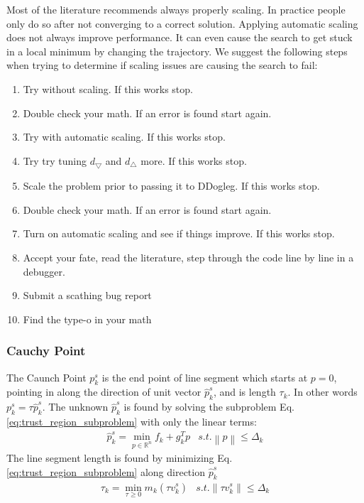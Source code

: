 \documentclass[peerreview,compsoc,onecolumn]{IEEEtran}
\newcommand{\R}{\mathbb{R}}
\newcommand{\norm}[1]{\left\lVert#1\right\rVert}
\newenvironment{enumargin}[1]{\begin{enumerate}[leftmargin=#1\textwidth , rightmargin=#1\textwidth]}{\end{enumerate}}
\begin{document}
Most of the literature recommends always properly scaling. In practice people only do so after not converging to a correct solution. Applying automatic scaling does not always improve performance. It can even cause the search to get stuck in a local minimum by changing the trajectory. We suggest the following steps when trying to determine if scaling issues are causing the search to fail:
\begin{enumargin}{0.2}
\item Try without scaling. If this works stop.
\item Double check your math. If an error is found start again.
\item Try with automatic scaling. If this works stop.
\item Try try tuning $d_{\bigtriangledown}$ and $d_{\bigtriangleup}$ more. If this works stop.
\item Scale the problem prior to passing it to DDogleg. If this works stop.
\item Double check your math. If an error is found start again.
\item Turn on automatic scaling and see if things improve. If this works stop.
\item Accept your fate, read the literature, step through the code line by line in a debugger.
\item Submit a scathing bug report
\item Find the type-o in your math
\end{enumargin}

\subsubsection{Cauchy Point}
\label{section:cauchy} 

The Caunch Point $p^s_k$ is the end point of line segment which starts at $p=0$, pointing in along the direction of unit vector $\hat{p}^s_k$, and is length $\tau_k$. In other words $p^s_k = \tau \hat{p}^s_k$. The unknown $\hat{p}^s_k$ is found by solving the subproblem Eq. \ref{eq:trust_region_subproblem} with only the linear terms:
\begin{equation}
\begin{array}{lr}
\hat{p}^s_k = \min\limits_{p\in \R^n} f_k + g_k^T p & s.t. \norm{p} \le \Delta_k
\end{array}
\end{equation}
The line segment length is found by minimizing Eq. \ref{eq:trust_region_subproblem} along direction $\hat{p}^s_k$
\begin{equation}
\begin{array}{lr}
\tau_k = \min\limits_{\tau \ge 0} m_k(\tau v^s_k) & s.t. \norm{\tau v^s_k} \le \Delta_k
\end{array}
\end{equation}
\end{document}
